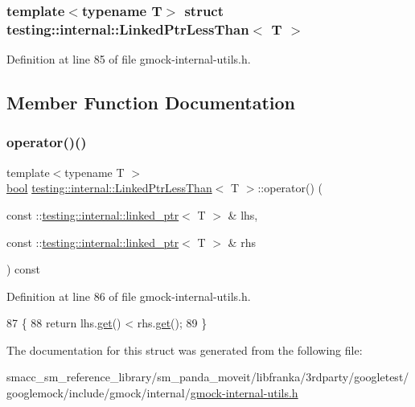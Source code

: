 \subsubsection*{template$<$typename T$>$\newline
struct testing\+::internal\+::\+Linked\+Ptr\+Less\+Than$<$ T $>$}



Definition at line 85 of file gmock-\/internal-\/utils.\+h.



\subsection{Member Function Documentation}
\mbox{\label{structtesting_1_1internal_1_1LinkedPtrLessThan_a0614293c43e51b280a870ab117355164}} 
\subsubsection{\texorpdfstring{operator()()}{operator()()}}
{\footnotesize\ttfamily template$<$typename T $>$ \\
\hyperlink{classbool}{bool} \hyperlink{structtesting_1_1internal_1_1LinkedPtrLessThan}{testing\+::internal\+::\+Linked\+Ptr\+Less\+Than}$<$ T $>$\+::operator() (\begin{DoxyParamCaption}\item[{const \+::\hyperlink{classtesting_1_1internal_1_1linked__ptr}{testing\+::internal\+::linked\+\_\+ptr}$<$ T $>$ \&}]{lhs,  }\item[{const \+::\hyperlink{classtesting_1_1internal_1_1linked__ptr}{testing\+::internal\+::linked\+\_\+ptr}$<$ T $>$ \&}]{rhs }\end{DoxyParamCaption}) const\hspace{0.3cm}{\ttfamily [inline]}}



Definition at line 86 of file gmock-\/internal-\/utils.\+h.


\begin{DoxyCode}
87                                                                  \{
88     \textcolor{keywordflow}{return} lhs.\hyperlink{classtesting_1_1internal_1_1linked__ptr_a0c2ba99eb3521806f83f5c4435465ce0}{get}() < rhs.\hyperlink{classtesting_1_1internal_1_1linked__ptr_a0c2ba99eb3521806f83f5c4435465ce0}{get}();
89   \}
\end{DoxyCode}


The documentation for this struct was generated from the following file\+:\begin{DoxyCompactItemize}
\item 
smacc\+\_\+sm\+\_\+reference\+\_\+library/sm\+\_\+panda\+\_\+moveit/libfranka/3rdparty/googletest/googlemock/include/gmock/internal/\hyperlink{gmock-internal-utils_8h}{gmock-\/internal-\/utils.\+h}\end{DoxyCompactItemize}
